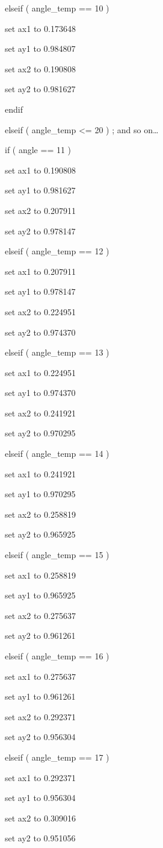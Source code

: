 \documentclass[
]{article}
\begin{document}
elseif ( angle\_temp == 10 )

set ax1 to 0.173648

set ay1 to 0.984807

set ax2 to 0.190808

set ay2 to 0.981627

endif

elseif ( angle\_temp \textless= 20 ) ; and so on\ldots{}

if ( angle == 11 )

set ax1 to 0.190808

set ay1 to 0.981627

set ax2 to 0.207911

set ay2 to 0.978147

elseif ( angle\_temp == 12 )

set ax1 to 0.207911

set ay1 to 0.978147

set ax2 to 0.224951

set ay2 to 0.974370

elseif ( angle\_temp == 13 )

set ax1 to 0.224951

set ay1 to 0.974370

set ax2 to 0.241921

set ay2 to 0.970295

elseif ( angle\_temp == 14 )

set ax1 to 0.241921

set ay1 to 0.970295

set ax2 to 0.258819

set ay2 to 0.965925

elseif ( angle\_temp == 15 )

set ax1 to 0.258819

set ay1 to 0.965925

set ax2 to 0.275637

set ay2 to 0.961261

elseif ( angle\_temp == 16 )

set ax1 to 0.275637

set ay1 to 0.961261

set ax2 to 0.292371

set ay2 to 0.956304

elseif ( angle\_temp == 17 )

set ax1 to 0.292371

set ay1 to 0.956304

set ax2 to 0.309016

set ay2 to 0.951056
\end{document}
